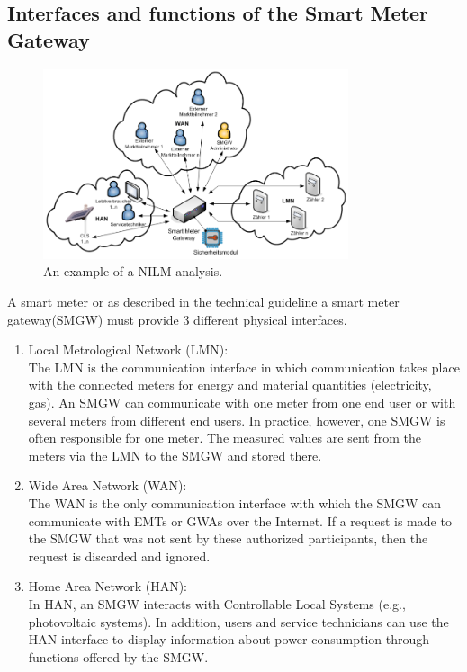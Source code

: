 \subsection{Interfaces and functions of the Smart Meter Gateway}
\begin{figure}[tbp]
  \centering
  \includegraphics[width=0.8\textwidth]{images/Smart_Meter_Interfaces.png}
  \caption[Short description]{An example of a NILM analysis.}
  \label{fig:Appliance_Model}
\end{figure}
A smart meter or as described in the technical guideline a smart meter gateway(SMGW) must provide 3 different physical interfaces.
\begin{enumerate}
\item Local Metrological Network (LMN):\\
The LMN is the communication interface in which communication takes place with the connected meters for energy and material quantities (electricity, gas). An SMGW can communicate with one meter from one end user or with several meters from different end users. In practice, however, one SMGW is often responsible for one meter. The measured values are sent from the meters via the LMN to the SMGW and stored there.
\item Wide Area Network (WAN):\\
The WAN is the only communication interface with which the SMGW can communicate with EMTs or GWAs over the Internet. If a request is made to the SMGW that was not sent by these authorized participants, then the request is discarded and ignored.
\item Home Area Network (HAN):\\
In HAN, an SMGW interacts with Controllable Local Systems (e.g., photovoltaic systems). In addition, users and service technicians can use the HAN interface to display information about power consumption through functions offered by the SMGW.
\end{enumerate}
